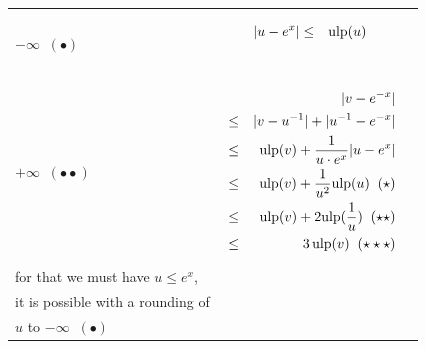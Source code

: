 \documentclass[12pt]{amsart}
\def\ulp{{\rm ulp}}
\begin{document}
\begin{center}
\begin{tabular}{l l l}

\begin{minipage}{2.5cm}


${\textnormal{error}}(u)$


$u \leftarrow \circ(e^x)$\\
$-\infty \;\; (\bullet)$

\end{minipage} &
\begin{minipage}{7.5cm}

\begin{eqnarray}\nonumber
  |u-e^x| &\leq& \ulp(u)\\\nonumber
\end{eqnarray}

\end{minipage} &
\begin{minipage}{6cm}
{\hspace{7cm}}
\end{minipage}\\%
\begin{minipage}{2.5cm}
${\textnormal{error}}(v)$


$v \leftarrow \circ({u}^{-1}) $\\
$+\infty \;\; (\bullet\bullet)$
\end{minipage} &
\begin{minipage}{7.5cm}



\begin{eqnarray}\nonumber
  &&|v-e^{-x}| \\\nonumber
  &       \leq&  |v - u^{-1}| +  |u^{-1}  - e^{-x}|\\\nonumber
  &       \leq& \ulp(v) + \frac{1}{u \cdot e^x} |u-e^{x}|\\\nonumber
  &       \leq& \ulp(v) + \frac{1}{u^2} \ulp(u)\;\;(\star)\\\nonumber
  &       \leq& \ulp(v) + 2 \ulp(\frac{1}{u})\;\;(\star\star)\\\nonumber
  &       \leq& 3 \, \ulp(v)\;\;(\star\star\star)
\end{eqnarray}


\end{minipage} &
\begin{minipage}{6cm}

$(\star)$

With $\frac{1}{e^x} \leq \frac{1}{u}$,\\
for that we must have $u \leq e^x$,\\
it is possible with a rounding of\\
$u$ to $-\infty \;\; (\bullet)$


\end{minipage}
\end{tabular}
\end{center}
\end{document}
